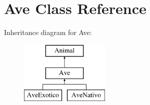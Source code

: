 \hypertarget{class_ave}{}\section{Ave Class Reference}
\label{class_ave}
Inheritance diagram for Ave\+:\begin{figure}[H]
\begin{center}
\leavevmode
\includegraphics[height=3.000000cm]{class_ave}
\end{center}
\end{figure}
